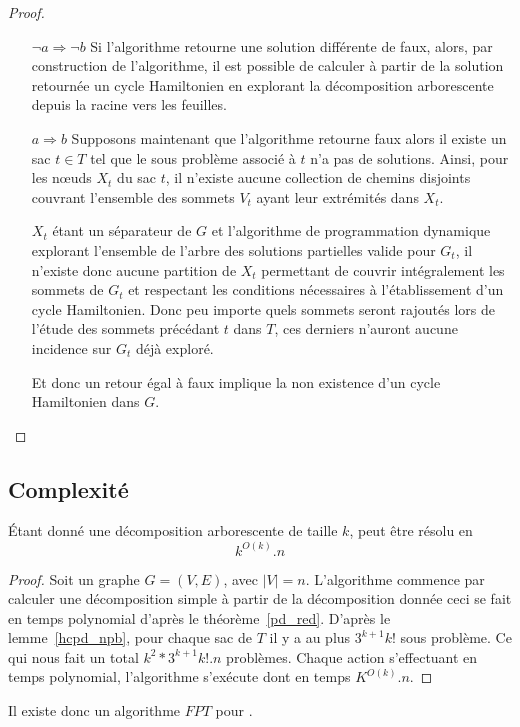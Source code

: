 \begin{proof}
    \begin{itemize}
        \item[$\neg a \Rightarrow \neg b$] Si l'algorithme retourne une solution différente de faux,
            alors, par construction de l'algorithme, il est possible de calculer à partir de la
            solution retournée un cycle Hamiltonien en explorant la décomposition arborescente
            depuis la racine vers les feuilles.
        \item[$a \Rightarrow b$] Supposons maintenant que l'algorithme retourne faux alors il existe
            un sac $t \in T$ tel que le sous problème associé à $t$ n'a pas de solutions. Ainsi,
            pour les n\oe uds $X_t$ du sac $t$, il n'existe aucune collection de chemins disjoints
            couvrant l'ensemble des sommets $V_t$ ayant leur extrémités dans $X_t$.
            
            $X_t$ étant un séparateur de $G$ et l'algorithme de programmation dynamique explorant
            l'ensemble de l'arbre des solutions partielles valide pour $G_t$, il n'existe donc
            aucune partition de $X_t$ permettant de couvrir intégralement les sommets de $G_t$ et
            respectant les conditions nécessaires à l'établissement d'un cycle Hamiltonien. Donc peu
            importe quels sommets seront rajoutés lors de l'étude des sommets précédant $t$ dans
            $T$, ces derniers n'auront aucune incidence sur $G_t$ déjà exploré.

            Et donc un retour égal à faux implique la non existence d'un cycle Hamiltonien dans $G$.
    \end{itemize}
\end{proof}

\subsection{Complexité}

\begin{nthrm}
    Étant donné une décomposition arborescente de taille $k$,  peut être résolu en
    \[
        k^{O(k)} . n
    \]
\end{nthrm}

\begin{proof}
    Soit un graphe $G = (V, E)$, avec $|V| = n$.
    L'algorithme commence par calculer une décomposition simple à partir de la décomposition donnée
    ceci se fait en temps polynomial d'après le théorème~\ref{pd_red}.
    D'après le lemme~\ref{hcpd_npb}, pour chaque sac de $T$ il y a au plus $3^{k+1}k!$ sous
    problème. 
    Ce qui nous fait un total $k^2*3^{k+1}k! . n$ problèmes.
    Chaque action s'effectuant en temps polynomial, l'algorithme s'exécute dont en temps $K^{O(k)} .
    n$.
\end{proof}

Il existe donc un algorithme $FPT$ pour .
